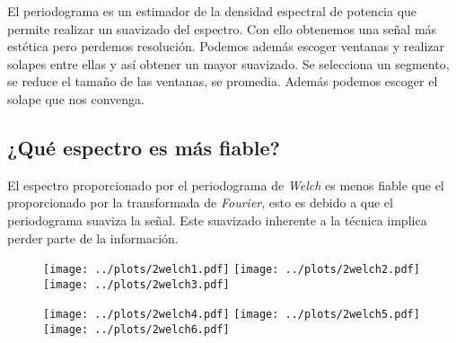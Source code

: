 \documentclass{article}
\begin{document}
El periodograma es un estimador de la densidad espectral de potencia
que permite realizar un suavizado del espectro. Con ello obtenemos una
señal más estética pero perdemos resolución. Podemos además escoger
ventanas y realizar solapes entre ellas y así obtener un mayor
suavizado. Se selecciona un segmento, se reduce el tamaño de las
ventanas, se promedia. Además podemos escoger el solape que nos
convenga.

\subsection{¿Qué espectro es más fiable?}

El espectro proporcionado por el periodograma de \textit{Welch} es
menos fiable que el proporcionado por la transformada de
\textit{Fourier}, esto es debido a que el periodograma suaviza la
señal. Este suavizado inherente a la técnica implica
perder parte de la información.

\newpage
\begin{figure}[h]
\centering
\texttt{[image: ../plots/2welch1.pdf]}
\texttt{[image: ../plots/2welch2.pdf]}
\texttt{[image: ../plots/2welch3.pdf]}
\end{figure}

\begin{figure}[h]
\centering
\texttt{[image: ../plots/2welch4.pdf]}
\texttt{[image: ../plots/2welch5.pdf]}
\texttt{[image: ../plots/2welch6.pdf]}
\end{figure}
\end{document}
